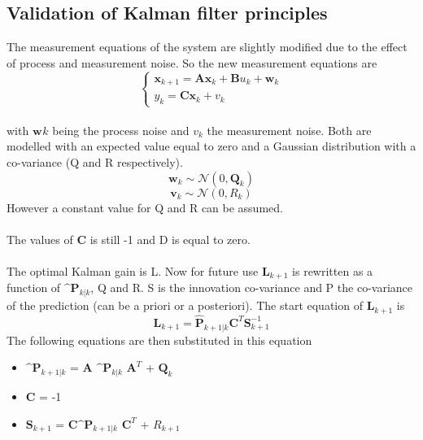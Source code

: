 \subsection{Validation of Kalman filter principles}

The measurement equations of the system are slightly modified due to the effect of process and measurement noise. So the new measurement equations are
\\
 \begin{equation}
    \begin{cases}
    \textbf{x}_{k+1} = \textbf{Ax}_{k} + \textbf{B}u_{k} + \textbf{w}_{k}\\
    y_{k} = \textbf{Cx}_{k} + v_{k}
    \end{cases}
    \label{eq:measurmentseq}
\end{equation}
\\
with $\textbf{w}_{}k$ being the process noise and $v_{k}$ the measurement noise. Both are modelled with an expected value equal to zero and a Gaussian distribution with a co-variance (Q and R respectively).
\begin{equation}
    \textbf{w}_{k} \sim \mathcal{N}(0,\textbf{Q}_k)
\end{equation}
\begin{equation}
    \textbf{v}_{k} \sim \mathcal{N}(0,R_k)
\end{equation}
However a constant value for Q and R can be assumed.\\
\\
The values of \textbf{C} is still -1 and D is equal to zero.\\
\\
The optimal Kalman gain is L. Now for future use $\textbf{L}_{k+1}$ is rewritten as a function of $\^{\textbf{P}}_{k|k}$, Q and R. S is the innovation co-variance and P the co-variance of the prediction (can be a priori or a posteriori). The start equation of $\textbf{L}_{k+1}$ is
\begin{equation}
    \textbf{L}_{k+1} = \hat{\textbf{P}}_{k+1|k} \textbf{C}^{T} \textbf{S}_{k+1}^{-1}
    \label{eq:beginvglLk+1}
\end{equation}
The following equations are then substituted in this equation
\begin{itemize}
    \label{eq:substituteequations}
    \item $\^{\textbf{P}}_{k+1|k}$ = $\textbf{A}$ $\^{\textbf{P}}_{k|k}$ $\textbf{A}^{T}$ + $\textbf{Q}_{k}$
    \item \textbf{C} = -1
    \item $\textbf{S}_{k+1}$ = \textbf{C}$\^{\textbf{P}}_{k+1|k}$ $\textbf{C}^{T}$ + $R_{k+1}$
\end{itemize}

